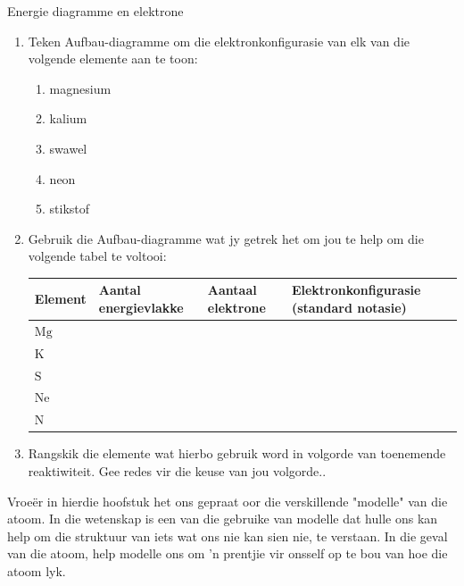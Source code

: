 \begin{exercises}{Energie diagramme en elektrone}
{
            \nopagebreak
        \label{m38741*id260063}\begin{enumerate}[noitemsep, label=\textbf{\arabic*}. ] 
            \label{m38741*uid106}\item Teken Aufbau-diagramme om die elektronkonfigurasie van elk van die volgende elemente aan te toon:
\label{m38741*id260079}\begin{enumerate}[noitemsep, label=\textbf{\alph*}. ] 
            \label{m38741*uid107}\item magnesium
\label{m38741*uid108}\item kalium
\label{m38741*uid109}\item swawel
\label{m38741*uid110}\item neon
\label{m38741*uid111}\item stikstof
\end{enumerate}
        \label{m38741*uid112}\item Gebruik die Aufbau-diagramme wat jy getrek het om jou te help om die volgende tabel te voltooi:
       \begin{center}
\begin{tabular}{|p{1.6cm}|p{2.6cm}|p{2.6cm}|p{2.6cm}|}\hline
\textbf{Element} & \textbf{Aantal energievlakke} & \textbf{Aantaal elektrone}  & \textbf{Elektronkonfigurasie (standard notasie)}\\\hline
$\text{Mg}$ & &  & \\\hline
$\text{K}$ & &  & \\\hline
$\text{S}$ & & & \\\hline
$\text{Ne}$ &  & & \\\hline
$\text{N}$ & & & \\\hline
\end{tabular}
\end{center}    

  \label{m38741*uid113}\item Rangskik die elemente wat hierbo gebruik word in volgorde van toenemende reaktiwiteit. Gee redes vir die keuse van jou volgorde..
 \end{enumerate}

}
\end{exercises}            
            \label{m38741*id260472}Vroe\"{e}r in hierdie hoofstuk het ons gepraat oor die verskillende "modelle" van die atoom. In die wetenskap is een van die gebruike van modelle dat hulle ons kan help om die struktuur van iets wat ons nie kan sien nie, te verstaan. In die geval van die atoom, help modelle ons om  'n prentjie vir onsself op te bou van hoe die atoom lyk.\par 
